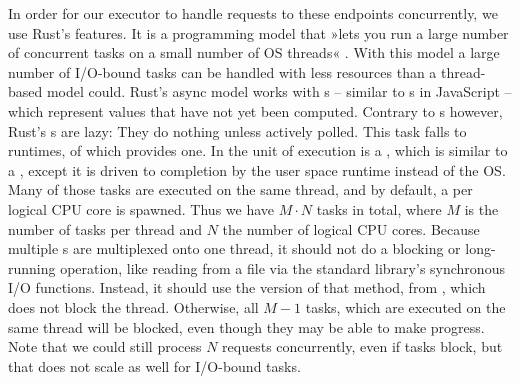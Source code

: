 


In order for our executor to handle requests to these endpoints concurrently, we use Rust's  features. It is a programming model that »lets you run a large number of concurrent tasks on a small number of OS threads« \cite{AsyncBook2021}. With this model a large number of I/O-bound tasks can be handled with less resources than a thread-based model could.
Rust's async model works with s -- similar to s in JavaScript -- which represent values that have not yet been computed. Contrary to s however, Rust's s are lazy: They do nothing unless actively polled. This task falls to  runtimes, of which  provides one. In  the unit of execution is a , which is similar to a , except it is driven to completion by the user space runtime instead of the OS. Many of those tasks are executed on the same thread, and by default, a  per logical CPU core is spawned. Thus we have $M \cdot N$ tasks in total, where $M$ is the number of tasks per thread and $N$ the number of logical CPU cores. Because multiple s are multiplexed onto one thread, it should not do a blocking or long-running operation, like reading from a file via the standard library's synchronous I/O functions. Instead, it should use the  version of that method, from , which does not block the thread. Otherwise, all $M - 1$ tasks, which are executed on the same thread will be blocked, even though they may be able to make progress. Note that we could still process $N$ requests concurrently, even if tasks block, but that does not scale as well for I/O-bound tasks.

